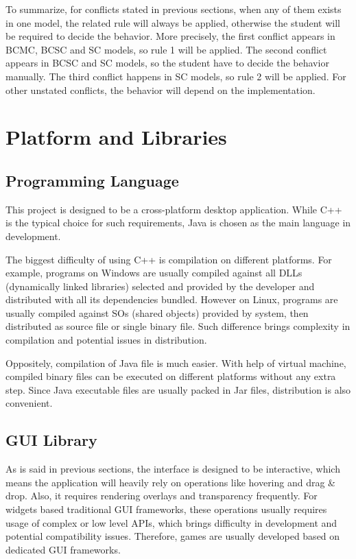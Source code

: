 \documentclass[msc,deptreport, cs]{infthesis}
\begin{document}
To summarize, for conflicts stated in previous sections, when any of them exists in one model, the related rule will always be applied, otherwise the student will be required to decide the behavior. More precisely, the first conflict appears in BCMC, BCSC and SC models, so rule 1 will be applied. The second conflict appears in BCSC and SC models, so the student have to decide the behavior manually. The third conflict happens in SC models, so rule 2 will be applied. For other unstated conflicts, the behavior will depend on the implementation.

\section{Platform and Libraries}

\subsection{Programming Language}

This project is designed to be a cross-platform desktop application. While C++ is the typical choice for such requirements, Java is chosen as the main language in development. 

The biggest difficulty of using C++ is compilation on different platforms. For example, programs on Windows are usually compiled against all DLLs (dynamically linked libraries) selected and provided by the developer and distributed with all its dependencies bundled. However on Linux, programs are usually compiled against SOs (shared objects) provided by system, then distributed as source file or single binary file. Such difference brings complexity in compilation and potential issues in distribution.

Oppositely, compilation of Java file is much easier. With help of virtual machine, compiled binary files can be executed on different platforms without any extra step. Since Java executable files are usually packed in Jar files, distribution is also convenient.

\subsection{GUI Library}

As is said in previous sections, the interface is designed to be interactive, which means the application will heavily rely on operations like hovering and drag \& drop. Also, it requires rendering overlays and transparency frequently. For widgets based traditional GUI frameworks, these operations usually requires usage of complex or low level APIs, which brings difficulty in development and potential compatibility issues. Therefore, games are usually developed based on dedicated GUI frameworks.
\end{document}
